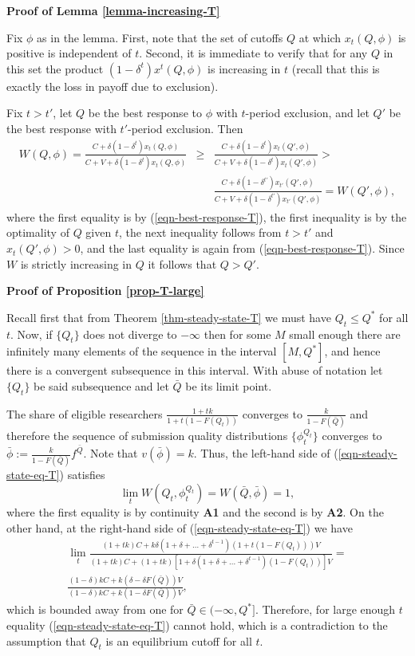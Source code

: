 \documentclass[12pt]{article}
\theoremstyle{plain}
\theoremstyle{definition}
\theoremstyle{remark}
\begin{document}
\bigskip

\noindent \textbf{Proof of Lemma \ref{lemma-increasing-T}}

    Fix $\phi$ as in the lemma. First, note that the set of cutoffs $Q$ at which $x_t(Q,\phi)$ is positive is independent of $t$. Second, it is immediate to verify that for any $Q$ in this set the product $(1-\delta^t)x^t(Q,\phi)$ is increasing in $t$ (recall that this is exactly the loss in payoff due to exclusion). 

    Fix $t>t'$, let $Q$ be the best response to $\phi$ with $t$-period exclusion, and let $Q'$ be the best response with $t'$-period exclusion. Then 
    \begin{eqnarray*}
    W(Q,\phi) = \frac{C+\delta(1-\delta^t)x_t(Q,\phi)}{C+V+\delta(1-\delta^t)x_t(Q,\phi)} & \ge & \frac{C+\delta(1-\delta^t)x_t(Q',\phi)}{C+V+\delta(1-\delta^t)x_t(Q',\phi)} > \\
    & & \frac{C+\delta(1-\delta^{t'})x_{t'}(Q',\phi)}{C+V+\delta(1-\delta^{t'})x_{t'}(Q',\phi)} = W(Q',\phi),
    \end{eqnarray*}
    where the first equality is by (\ref{eqn-best-response-T}), the first inequality is by the optimality of $Q$ given $t$, the next inequality follows from $t>t'$ and $x_t(Q',\phi)>0$, and the last equality is again from (\ref{eqn-best-response-T}). Since $W$ is strictly increasing in $Q$ it follows that $Q>Q'$.


\bigskip

\noindent \textbf{Proof of Proposition \ref{prop-T-large}}

    Recall first that from Theorem \ref{thm-steady-state-T} we must have $Q_t\le Q^*$ for all $t$. Now, if $\{Q_t\}$ does not diverge to $-\infty$ then for some $M$ small enough there are infinitely many elements of the sequence in the interval $[M,Q^*]$, and hence there is a convergent subsequence in this interval. With abuse of notation let $\{Q_t\}$ be said subsequence and let $\bar Q$ be its limit point.  
    
    The share of eligible researchers $\frac{1+tk}{1+t(1-F(Q_t))}$ converges to $\frac{k}{1-F(\bar Q)}$ and therefore the sequence of submission quality distributions $\{\phi^{Q_t}_t\}$ converges to $\bar \phi:= \frac{k}{1-F(\bar Q)}f^{\bar Q}$. Note that $v(\bar \phi)=k$. Thus, the left-hand side of (\ref{eqn-steady-state-eq-T}) satisfies
    $$\lim_t W(Q_t, \phi^{Q_t}_t) = W(\bar Q, \bar \phi)=1,$$
    where the first equality is by continuity \textbf{A1} and the second is by \textbf{A2}. On the other hand, at the right-hand side of (\ref{eqn-steady-state-eq-T}) we have
\begin{eqnarray*}
     \lim_t \frac{(1+tk)C+k\delta(1+\delta+\ldots+\delta^{t-1}) (1+t(1-F(Q_t)))V}{(1+tk)C+(1+tk)[1+\delta(1+\delta+\ldots+\delta^{t-1})(1-F(Q_t))]V} =\\
    \frac{(1-\delta)kC+k(\delta -\delta F(\bar Q))V}{(1-\delta)kC+k(1-\delta F(\bar Q))V},
\end{eqnarray*}
    which is bounded away from one for $\bar Q\in (-\infty, Q^*]$. Therefore, for large enough $t$ equality (\ref{eqn-steady-state-eq-T}) cannot hold, which is a contradiction to the assumption that $Q_t$ is an equilibrium cutoff for all $t$.
\end{document}
